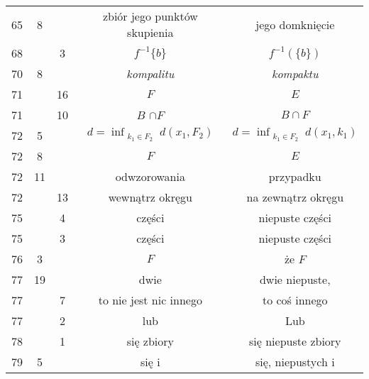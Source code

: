 \documentclass[a4paper,11pt]{article}
\begin{document}
\begin{center}
\begin{tabular}{|c|c|c|c|c|}
    65  &  8 & & zbiór jego punktów skupienia & jego domknięcie \\
    68  & &  3 & $f^{ -1 } \{ b \}$ & $f^{ -1 }( \{ b \} )$ \\
    70  &  8 & & \emph{kompalitu} & \emph{kompaktu} \\
    71  & & 16 & $F$ & $E$ \\
    71  & & 10 & $B$ $\cap F$ & $B \cap F$ \\
    72  &  5 & & $d = \inf_{ \substack{ k_{ 1 } \in F_{ 2 } } }
                 d( x_{ 1 }, F_{ 2 } )$
           & $d = \inf_{ \substack{ k_{ 1 } \in F_{ 2 } } }
             d( x_{ 1 }, k_{ 1 } )$ \\
    72  &  8 & & $F$ & $E$ \\
    72  & 11 & & odwzorowania & przypadku \\
    72  & & 13 & wewnątrz okręgu & na zewnątrz okręgu \\
    75  & &  4 & części & niepuste części \\
    75  & &  3 & części & niepuste części \\
    76  &  3 & & $F$ & że $F$ \\
    77  & 19 & & dwie & dwie niepuste, \\
    77  & &  7 & to nie jest nic innego & to coś innego \\
    77  & &  2 & lub & Lub \\
    78  & &  1 & się zbiory & się niepuste zbiory \\
    79  &  5 & & się i & się, niepustych i \\
    \hline
  \end{tabular}

\end{center}
\end{document}
